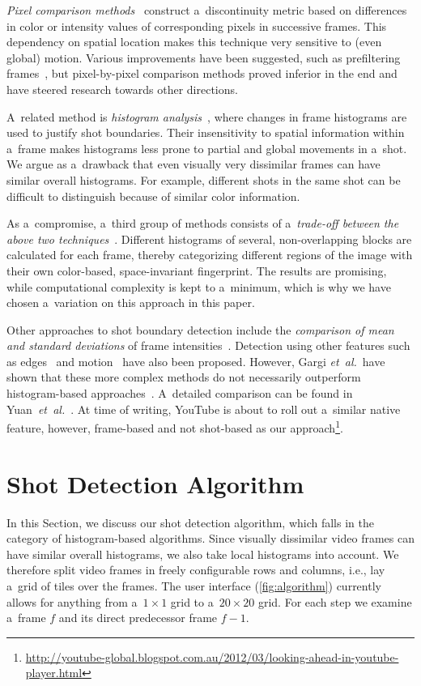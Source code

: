 \documentclass{sig-alternate}
\newcommand{\inlinelistingsize}{\fontsize{8pt}{11pt}}
\let\oldurl\url
\renewcommand{\url}[1]{\inlinelistingsize\oldurl{#1}}
\begin{document}
\emph{Pixel comparison methods}~\cite{Hampapur1994, Zhang1993} construct a~discontinuity metric based on differences in color or intensity values of corresponding pixels in successive frames. This dependency on spatial location makes this technique very sensitive to (even global) motion. Various improvements have been suggested, such as prefiltering frames~\cite{Zhang1995}, but pixel-by-pixel comparison methods proved inferior in the end and have steered research towards other directions.

A~related method is \emph{histogram analysis}~\cite{Smeaton1999}, where changes in frame histograms are used to justify shot boundaries. Their insensitivity to spatial information within a~frame makes histograms less prone to partial and global movements in a~shot. We argue as a~drawback that even visually very dissimilar frames can have similar overall histograms. For example, different shots in the same shot can be difficult to distinguish because of similar color information.

As a~compromise, a~third group of methods consists of a~\emph{trade-off between the above two techniques}~\cite{Ahmed1999}. Different histograms of several, non-overlapping blocks are calculated for each frame, thereby categorizing different regions of the image with their own color-based, space-invariant fingerprint. The results are promising, while computational complexity is kept to a~minimum, which is why we have chosen a~variation on this approach in this paper.

Other approaches to shot boundary detection include the \emph{comparison of mean and standard deviations} of frame intensities~\cite{Lienhart1999}. Detection using other features such as edges~\cite{Zabih1995} and motion~\cite{Bouthemy1997} have also been proposed. However, Gargi \emph{et~al.}\ have shown that these more complex methods do not necessarily outperform histogram-based approaches~\cite{Gargi2000}. A~detailed comparison can be found in Yuan~\emph{et~al.}~\cite{Yuan2007}.
At time of writing, YouTube is about to roll out
a~similar native feature, however, frame-based and not shot-based as our approach\footnote{\url{http://youtube-global.blogspot.com.au/2012/03/looking-ahead-in-youtube-player.html}}.

\section{Shot Detection Algorithm} \label{sec:details-of-algo}
In this Section, we discuss our shot detection algorithm, which falls in the category of histogram-based algorithms.  Since visually dissimilar video frames can have similar overall histograms, we also take local histograms into account. 
We therefore split video frames in freely configurable rows and columns, i.e., lay a~grid of tiles over the frames. The user interface (\autoref{fig:algorithm}) currently allows for anything from a~$\mathit{1} \times \mathit{1}$ grid to a~$\mathit{20} \times \mathit{20}$ grid. For each step we examine a~frame $\mathit{f}$ and its direct predecessor frame $\mathit{f - 1}$.
\end{document}
